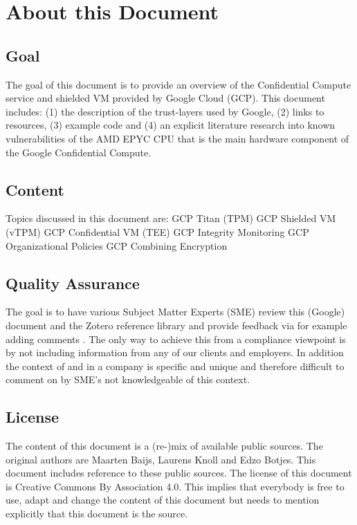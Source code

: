 
\section{About this Document}

 
\subsection{Goal}
The goal of this document is to provide an overview of the Confidential Compute service and shielded VM provided by Google Cloud (GCP). This document includes: (1) the description of the trust-layers used by Google, (2) links to resources, (3) example code and (4) an explicit literature research into known vulnerabilities of the AMD EPYC CPU that is the main hardware component of the Google Confidential Compute. 

\subsection{Content}
Topics discussed in this document are:
GCP Titan (TPM)
GCP Shielded VM (vTPM)
GCP Confidential VM (TEE)
GCP Integrity Monitoring
GCP Organizational Policies
GCP Combining Encryption

\subsection{Quality Assurance}
The goal is to have various Subject Matter Experts (SME) review this (Google) document and the Zotero reference library and provide feedback via for example adding comments . 
The only way to achieve this from a compliance viewpoint is by not including information from any of our clients and employers. In addition the context of and in a company is specific and unique and therefore difficult to comment on by SME’s not knowledgeable of this context.

\subsection{License}
The content of this document is a (re-)mix of available public sources. The original authors are Maarten Baijs, Laurens Knoll and Edzo Botjes. This document includes reference to these public sources. The license of this document is Creative Commons By Association 4.0. This implies that everybody is free to use, adapt and change the content of this document but needs to mention explicitly that this document is the source.


